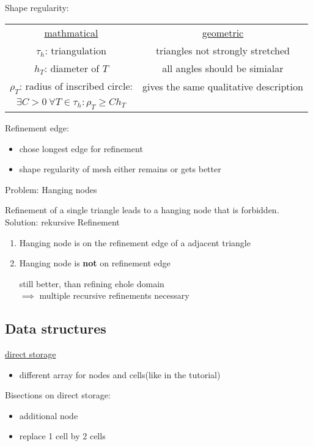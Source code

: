 Shape regularity:
\begin{center}
	\begin{tabular}{c | c}
		\underline{mathmatical} & \underline{geometric}\\
		$\tau_h$:  triangulation & triangles not strongly stretched \\
		$h_T$:  diameter of $T$ & all angles should be \glqq simialar \grqq \\
		$\rho_T$:  radius of inscribed circle:	& gives the same qualitative description\\
		$\exists C > 0\ \forall T \in \tau_h \colon \rho_T \geq C h_T$ & 
	\end{tabular}
\end{center}


Refinement edge:
\begin{itemize}
	\item chose longest edge for refinement
	\item shape regularity of mesh either remains or gets better
\end{itemize}

Problem: Hanging nodes

Refinement of a single triangle leads to a hanging node that is forbidden.\\
Solution: rekursive Refinement
\begin{enumerate}[label= case \arabic*:]
	\item Hanging node is on the refinement edge of a adjacent triangle
	

	\item Hanging node is \textbf{not} on refinement edge
	
	still better, than refining ehole domain\\
	$\implies$ multiple recursive refinements necessary
\end{enumerate}

\subsection{Data structures}
\underline{direct storage}
\begin{itemize}
	\item different array for nodes and cells(like in the tutorial)
	
\end{itemize}
Bisections on direct storage:
\begin{itemize}
	\item additional node
	\item replace 1 cell by 2 cells
	
\end{itemize}

